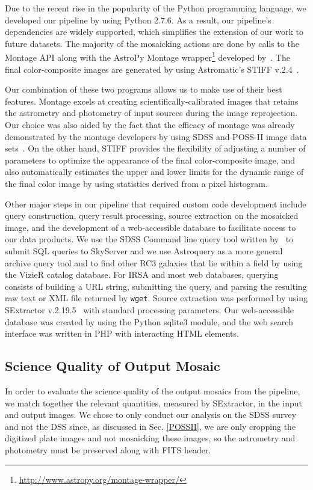 \documentclass[authoryear, 12pt, 5p, times]{elsarticle}
\begin{document}
Due to the recent rise in the popularity of the Python programming language, we developed our pipeline by using Python 2.7.6. As a result, our pipeline's dependencies are widely supported, which simplifies the extension of our work to future datasets. The majority of the mosaicking actions are done by calls to the Montage API along with the AstroPy Montage wrapper\footnote{\url{http://www.astropy.org/montage-wrapper/}} developed by~\cite{montpy}. The final color-composite images are generated by using Astromatic's STIFF v.2.4~\citep{stiff}. 

Our combination of these two programs allows us to make use of their best features. Montage excels at creating scientifically-calibrated images that retains the astrometry and photometry of input sources during the image reprojection. Our choice was also aided by the fact that the efficacy of montage was already demonstrated by the montage developers by using SDSS and POSS-II image data sets~\citep{montage}. On the other hand, STIFF provides the flexibility of adjusting a number of parameters to optimize the appearance of the final color-composite image, and also automatically estimates the upper and lower limits for the dynamic range of the final color image by using statistics derived from a pixel histogram. 

Other major steps in our pipeline that required custom code development include query construction, query result processing, source extraction on the mosaicked image, and the development of a web-accessible database to facilitate access to our data products. We use the SDSS Command line query tool written by~\cite{sqlclref}  to submit SQL queries to SkyServer and we use Astroquery as a more general archive query tool and to find other RC3 galaxies that lie within a field by using the VizieR catalog database. For IRSA and most web databases, querying consists of building a URL string, submitting the query, and parsing the resulting  raw text or XML file returned by \texttt{wget}. Source extraction was performed by using SExtractor v.2.19.5~\citep{sextractor} with standard processing parameters. Our web-accessible database was created by using the Python sqlite3 module, and the web search interface was written in PHP with interacting HTML elements.
\subsection{Science Quality of Output Mosaic\label{preserved}}
In order to evaluate the science quality of the output mosaics from the pipeline, we match together the relevant quantities, measured by SExtractor, in the input and output images. We chose to only conduct our analysis on the SDSS survey and not the DSS since, as discussed in Sec. \ref{POSSII}, we are only cropping the digitized plate images and not mosaicking these images, so the astrometry and photometry must be preserved along with FITS header.
\end{document}
